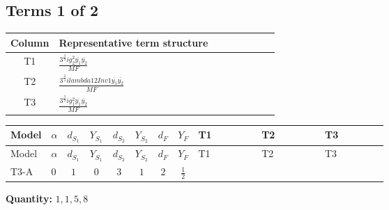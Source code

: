 \documentclass[8pt]{article}
\begin{document}
\begin{landscape}
\subsection*{Terms 1 of 2}
\begin{center}
\begin{tabular}{@{}c >{\raggedright\arraybackslash}p{0.82\linewidth}@{}}
\toprule
Column & Representative term structure \\
\midrule
T1 & \(\displaystyle \frac{3^{\frac{3}{4}} i g_{2}^{2} \overline{y_{1}} \overline{y_{2}}}{MF}\) \\
\midrule
T2 & \(\displaystyle \frac{3^{\frac{3}{4}} i lambda12Inv1 \overline{y_{1}} \overline{y_{2}}}{MF}\) \\
\midrule
T3 & \(\displaystyle \frac{3^{\frac{3}{4}} i g_{1}^{2} \overline{y_{1}} \overline{y_{2}}}{MF}\) \\
\midrule
\bottomrule
\end{tabular}
\end{center}
\smallskip
\tiny
\begin{longtable}{@{}llcccccc >{\raggedright\arraybackslash}p{0.21\linewidth} >{\raggedright\arraybackslash}p{0.21\linewidth} >{\raggedright\arraybackslash}p{0.21\linewidth}@{}}
\toprule
Model & $\alpha$ & $d_{S_1}$ & $Y_{S_1}$ & $d_{S_2}$ & $Y_{S_2}$ & $d_F$ & $Y_F$ & T1 & T2 & T3 \\
\midrule
\endfirsthead
\toprule
Model & $\alpha$ & $d_{S_1}$ & $Y_{S_1}$ & $d_{S_2}$ & $Y_{S_2}$ & $d_F$ & $Y_F$ & T1 & T2 & T3 \\
\midrule
\endhead
T3-A & $0$ & $1$ & $0$ & $3$ & $1$ & $2$ & $\frac{1}{2}$ & \scriptsize\adjustbox{max width=\linewidth}{$\begin{gathered} - \frac{11 \cdot 3^{\frac{3}{4}} i g_{2}^{2} \overline{y_{1}} \overline{y_{2}}}{8 MF}\end{gathered}$} & \scriptsize\adjustbox{max width=\linewidth}{$\begin{gathered} - \frac{3^{\frac{3}{4}} i lambda12Inv1 \overline{y_{1}} \overline{y_{2}}}{6 MF}\end{gathered}$} & \scriptsize\adjustbox{max width=\linewidth}{$\begin{gathered} - \frac{3^{\frac{3}{4}} i g_{1}^{2} \overline{y_{1}} \overline{y_{2}}}{8 MF}\end{gathered}$} \\
\midrule
\bottomrule
\end{longtable}
\clearpage
\noindent\textbf{Quantity: }$\mathrm{1,1,5,8}$\par\smallskip

\end{landscape}
\end{document}

